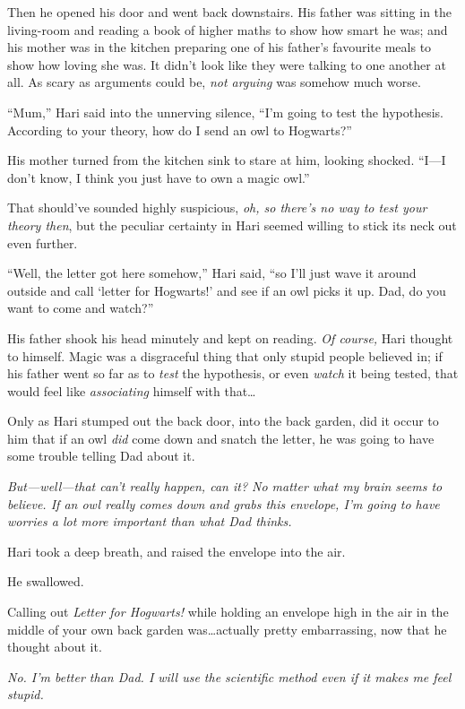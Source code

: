 Then he opened his door and went back downstairs. His father was sitting in the living-room and reading a book of higher maths to show how smart he was; and his mother was in the kitchen preparing one of his father’s favourite meals to show how loving she was. It didn’t look like they were talking to one another at all. As scary as arguments could be, \emph{not arguing} was somehow much worse.

“Mum,” Hari said into the unnerving silence, “I’m going to test the hypothesis. According to your theory, how do I send an owl to Hogwarts?”

His mother turned from the kitchen sink to stare at him, looking shocked. “I—I don’t know, I think you just have to own a magic owl.”

That should’ve sounded highly suspicious, \emph{oh, so there’s no way to test your theory then}, but the peculiar certainty in Hari seemed willing to stick its neck out even further.

“Well, the letter got here somehow,” Hari said, “so I’ll just wave it around outside and call ‘letter for Hogwarts!’ and see if an owl picks it up. Dad, do you want to come and watch?”

His father shook his head minutely and kept on reading. \emph{Of course,} Hari thought to himself. Magic was a disgraceful thing that only stupid people believed in; if his father went so far as to \emph{test} the hypothesis, or even \emph{watch} it being tested, that would feel like \emph{associating} himself with that…

Only as Hari stumped out the back door, into the back garden, did it occur to him that if an owl \emph{did} come down and snatch the letter, he was going to have some trouble telling Dad about it.

\emph{But—well—that can’t \emph{really} happen, can it? No matter what my brain seems to believe. If an owl really comes down and grabs this envelope, I’m going to have worries a lot more important than what Dad thinks.}

Hari took a deep breath, and raised the envelope into the air.

He swallowed.

Calling out \emph{Letter for Hogwarts!} while holding an envelope high in the air in the middle of your own back garden was…actually pretty embarrassing, now that he thought about it.

\emph{No. I’m better than Dad. I will use the scientific method even if it makes me feel stupid.}

